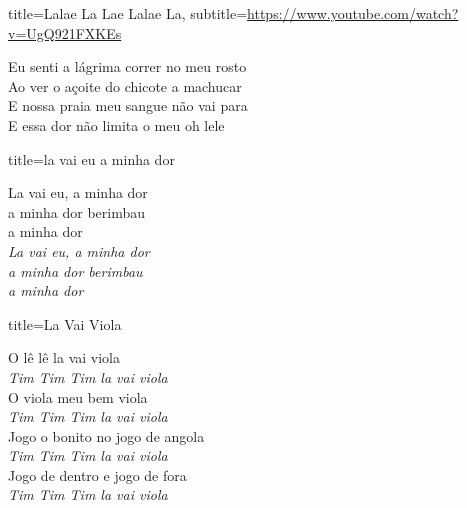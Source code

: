 \documentclass[fontsize=14pt, paper=a4, twoside, DIV=20]{scrreprt} %
\begin{document}
\begin{multicols*}{2}
\begin{song}{title={Lalae La Lae Lalae La}, subtitle={\url{https://www.youtube.com/watch?v=UgQ921FXKEs}}}
{\begin{verse*}
            Eu senti a lágrima correr no meu rosto \\
            Ao ver o açoite do chicote a machucar \\
            E nossa praia meu sangue não vai para \\
            E essa dor não limita o meu oh lele \\
    \end{verse*}}
\end{song}

\begin{song}{title={la vai eu a minha dor}}
    \begin{verse*}
            La vai eu, a minha dor\\
            a minha dor berimbau\\
            a minha dor\\
            \textit{
            La vai eu, a minha dor\\
            a minha dor berimbau\\
            a minha dor\\}
    \end{verse*}
\end{song}

\begin{song}{title={La Vai Viola}}
    \begin{verse*}
        O lê lê la vai viola\\
        \textit{Tim Tim Tim la vai viola}\\
        O viola meu bem viola\\
        \textit{Tim Tim Tim la vai viola}\\
        Jogo o bonito no jogo de angola\\
        \textit{Tim Tim Tim la vai viola}\\
        Jogo de dentro e jogo de fora\\
        \textit{Tim Tim Tim la vai viola}\\
        \end{verse*}
\end{song}


\end{multicols*}
\end{document}
